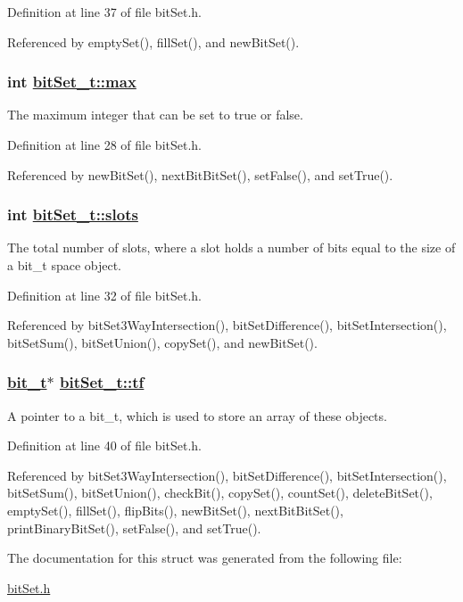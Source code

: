 Definition at line 37 of file bit\-Set.h.

Referenced by empty\-Set(), fill\-Set(), and new\-Bit\-Set().\hypertarget{structbitSet__t_o0}{
\subsubsection[max]{\setlength{\rightskip}{0pt plus 5cm}int \hyperlink{structbitSet__t_o0}{bit\-Set\_\-t::max}}}
\label{structbitSet__t_o0}


The maximum integer that can be set to true or false.

Definition at line 28 of file bit\-Set.h.

Referenced by new\-Bit\-Set(), next\-Bit\-Bit\-Set(), set\-False(), and set\-True().\hypertarget{structbitSet__t_o1}{
\subsubsection[slots]{\setlength{\rightskip}{0pt plus 5cm}int \hyperlink{structbitSet__t_o1}{bit\-Set\_\-t::slots}}}
\label{structbitSet__t_o1}


The total number of slots, where a slot holds a number of bits equal to the size of a bit\_\-t space object.

Definition at line 32 of file bit\-Set.h.

Referenced by bit\-Set3Way\-Intersection(), bit\-Set\-Difference(), bit\-Set\-Intersection(), bit\-Set\-Sum(), bit\-Set\-Union(), copy\-Set(), and new\-Bit\-Set().\hypertarget{structbitSet__t_o3}{
\subsubsection[tf]{\setlength{\rightskip}{0pt plus 5cm}\hyperlink{bitSet_8h_a9}{bit\_\-t}$\ast$ \hyperlink{structbitSet__t_o3}{bit\-Set\_\-t::tf}}}
\label{structbitSet__t_o3}


A pointer to a bit\_\-t, which is used to store an array of these objects.

Definition at line 40 of file bit\-Set.h.

Referenced by bit\-Set3Way\-Intersection(), bit\-Set\-Difference(), bit\-Set\-Intersection(), bit\-Set\-Sum(), bit\-Set\-Union(), check\-Bit(), copy\-Set(), count\-Set(), delete\-Bit\-Set(), empty\-Set(), fill\-Set(), flip\-Bits(), new\-Bit\-Set(), next\-Bit\-Bit\-Set(), print\-Binary\-Bit\-Set(), set\-False(), and set\-True().

The documentation for this struct was generated from the following file:\begin{CompactItemize}
\item 
\hyperlink{bitSet_8h}{bit\-Set.h}\end{CompactItemize}

